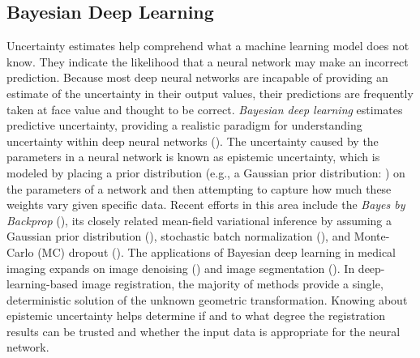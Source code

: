 \documentclass[times,twocolumn,final]{elsarticle}
\begin{document}
\subsection{Bayesian Deep Learning}
Uncertainty estimates help comprehend what a machine learning model does not know. They indicate the likelihood that a neural network may make an incorrect prediction. Because most deep neural networks are incapable of providing an estimate of the uncertainty in their output values, their predictions are frequently taken at face value and thought to be correct. \textit{Bayesian deep learning} estimates predictive uncertainty, providing a realistic paradigm for understanding uncertainty within deep neural networks (\cite{gal2016dropout}). The uncertainty caused by the parameters in a neural network is known as epistemic uncertainty, which is modeled by placing a prior distribution (e.g., a Gaussian prior distribution: ) on the parameters of a network and then attempting to capture how much these weights vary given specific data. Recent efforts in this area include the \textit{Bayes by Backprop} (\cite{blundell2015weight}), its closely related mean-field variational inference by assuming a Gaussian prior distribution (\cite{Tolle2021}), stochastic batch normalization (\cite{atanov2018uncertainty}), and Monte-Carlo (MC) dropout (\cite{gal2016dropout, Kendall2017}). The applications of Bayesian deep learning in medical imaging expands on image denoising (\cite{Tolle2021, Laves2020}) and image segmentation (\cite{devries2018leveraging, baumgartner2019phiseg, mehrtash2020confidence}). In deep-learning-based image registration, the majority of methods provide a single, deterministic solution of the unknown geometric transformation. Knowing about epistemic uncertainty helps determine if and to what degree the registration results can be trusted and whether the input data is appropriate for the neural network. 
\end{document}
